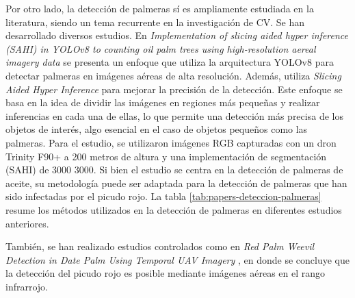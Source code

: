 
Por otro lado, la detección de palmeras sí es ampliamente estudiada en la literatura, siendo un tema recurrente en la investigación de CV. Se han desarrollado diversos estudios. En \textit{Implementation of slicing aided hyper inference (SAHI) in YOLOv8 to counting oil palm trees using high-resolution aereal imagery data} \citep{zhorif_implementation_2024} se presenta un enfoque que utiliza la arquitectura YOLOv8 para detectar palmeras en imágenes aéreas de alta resolución. Además, utiliza \textit{Slicing Aided Hyper Inference} para mejorar la precisión de la detección. Este enfoque se basa en la idea de dividir las imágenes en regiones más pequeñas y realizar inferencias en cada una de ellas, lo que permite una detección más precisa de los objetos de interés, algo esencial en el caso de objetos pequeños como las palmeras. Para el estudio, se utilizaron imágenes RGB capturadas con un dron Trinity F90+ a 200 metros de altura y una implementación de segmentación (SAHI) de \SI{3000}{}\,\texttimes\,\SI{3000}{\pixel}. Si bien el estudio se centra en la detección de palmeras de aceite, su metodología puede ser adaptada para la detección de palmeras que han sido infectadas por el picudo rojo. La tabla \ref{tab:papers-deteccion-palmeras} resume los métodos utilizados en la detección de palmeras en diferentes estudios anteriores.

También, se han realizado estudios controlados como en \textit{Red Palm Weevil Detection in Date Palm Using Temporal UAV Imagery} \citep{delalieux_red_2023}, en donde se concluye que la detección del picudo rojo es posible mediante imágenes aéreas en el rango infrarrojo.

